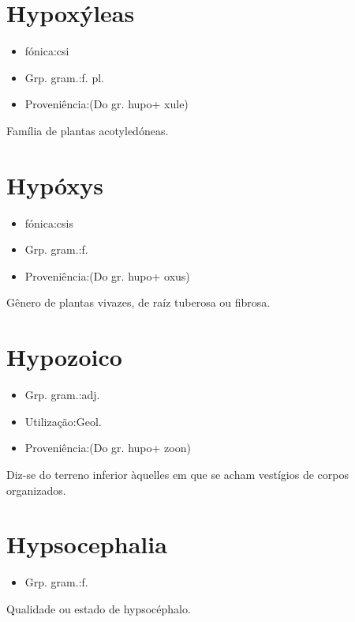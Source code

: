 \documentclass{article}
\begin{document}
\section{Hypoxýleas}
\begin{itemize}
\item {fónica:csi}
\end{itemize}
\begin{itemize}
\item {Grp. gram.:f. pl.}
\end{itemize}
\begin{itemize}
\item {Proveniência:(Do gr. \textunderscore hupo\textunderscore  + \textunderscore xule\textunderscore )}
\end{itemize}
Família de plantas acotyledóneas.
\section{Hypóxys}
\begin{itemize}
\item {fónica:csis}
\end{itemize}
\begin{itemize}
\item {Grp. gram.:f.}
\end{itemize}
\begin{itemize}
\item {Proveniência:(Do gr. \textunderscore hupo\textunderscore  + \textunderscore oxus\textunderscore )}
\end{itemize}
Gênero de plantas vivazes, de raíz tuberosa ou fibrosa.
\section{Hypozoico}
\begin{itemize}
\item {Grp. gram.:adj.}
\end{itemize}
\begin{itemize}
\item {Utilização:Geol.}
\end{itemize}
\begin{itemize}
\item {Proveniência:(Do gr. \textunderscore hupo\textunderscore  + \textunderscore zoon\textunderscore )}
\end{itemize}
Diz-se do terreno inferior àquelles em que se acham vestígios de corpos organizados.
\section{Hypsocephalia}
\begin{itemize}
\item {Grp. gram.:f.}
\end{itemize}
Qualidade ou estado de hypsocéphalo.
\end{document}
